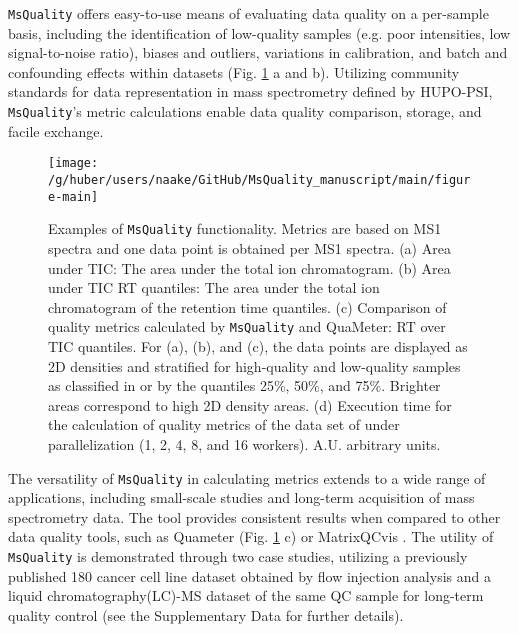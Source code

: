 \documentclass{bioinfo}
\begin{document}
\texttt{MsQuality} offers easy-to-use means of evaluating data quality on a 
per-sample basis, including the identification of low-quality samples 
(e.g. poor intensities, low signal-to-noise ratio), biases and outliers, 
variations in calibration, and batch and confounding effects within datasets
(Fig. \ref{fig:fig1} a and b). 
Utilizing community standards for data representation in mass spectrometry 
defined by HUPO-PSI, \texttt{MsQuality}'s metric calculations enable 
data quality comparison, storage, and facile exchange.

\begin{figure}[ht!]
    \centering
 	\texttt{[image: /g/huber/users/naake/GitHub/MsQuality\_manuscript/main/figure-main]}
 	  \caption{Examples of \texttt{MsQuality} functionality. Metrics are based
 	        on MS1 spectra and one data point is obtained per MS1 spectra.
 	        (a) Area under TIC: The area under the total ion chromatogram. 
            (b) Area under TIC RT quantiles: The area under the total ion
                chromatogram of the retention time quantiles. 
            (c) Comparison of quality metrics calculated by \texttt{MsQuality} 
                and QuaMeter: RT over TIC quantiles. 
            For (a), (b), and (c), the data points are displayed 
                as 2D densities and stratified for high-quality and low-quality
                samples as classified in \cite{Amidan2014} or by the
                quantiles 25\%, 50\%, and 75\%. Brighter areas correspond to 
                high 2D density areas.
            (d) Execution time for the calculation of quality metrics of the 
                data set of \cite{Amidan2014} under parallelization 
                (1, 2, 4, 8, and 16 workers). A.U. arbitrary units.
    } \label{fig:fig1}
\end{figure}

The versatility of \texttt{MsQuality} in calculating metrics extends to a 
wide range of applications, including small-scale studies and long-term 
acquisition of mass spectrometry data. The tool provides consistent results 
when compared to other data quality tools, such as Quameter \citep{Ma2012} 
(Fig. \ref{fig:fig1} c) or MatrixQCvis \citep{Naake2022}. 
The utility of \texttt{MsQuality} is demonstrated through two case studies, 
utilizing a previously published 180 cancer cell line dataset obtained by 
flow injection analysis \citep{Cherkaoui2022} and a liquid 
chromatography(LC)-MS dataset of
the same QC sample \citep{Amidan2014} for long-term quality control 
(see the Supplementary Data for further details).
\end{document}
